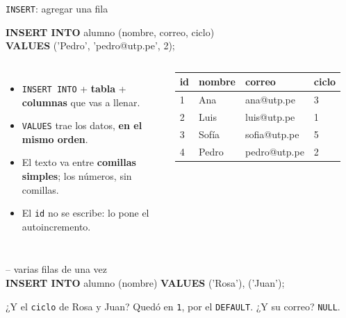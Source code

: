 \documentclass[aspectratio=169,10pt,c]{beamer}
\newcommand{\kw}[1]{\textcolor{utpRojo}{\textbf{#1}}}
\newcommand{\nuevo}[1]{{%
  \setlength{\fboxsep}{1.2pt}%
  \begingroup
  \renewcommand{\kw}[1]{\textcolor{utpNegro}{\textbf{##1}}}%
  \colorbox{yellow!45}{\textcolor{utpNegro}{#1}}%
  \endgroup}}
\newcommand{\com}[1]{\textcolor{utpGris}{-- #1}}
\newenvironment{sqlcode}[1][.86\textwidth]
  {\begin{center}\begin{lrbox}{\sqlbuf}\begin{minipage}{#1}\ttfamily\footnotesize\vspace{6pt}\raggedright}
  {\vspace{6pt}\end{minipage}\end{lrbox}\colorbox{utpGrisClaro}{\usebox{\sqlbuf}}\end{center}}
\begin{document}
\begin{frame}{\texttt{INSERT}: agregar una fila}
\begin{sqlcode}[.78\textwidth]
\kw{INSERT INTO} alumno (nombre, correo, ciclo)\\
\kw{VALUES} ('Pedro', 'pedro@utp.pe', 2);
\end{sqlcode}
\vspace{0.1cm}
\begin{columns}[c,onlytextwidth]
\small
\begin{itemize}\setlength\itemsep{4pt}
  \item \texttt{INSERT INTO} + \textbf{tabla} + \textbf{columnas} que vas a llenar.
  \item \texttt{VALUES} trae los datos, \textbf{en el mismo orden}.
  \item El texto va entre \textbf{comillas simples}; los números, sin comillas.
  \item El \texttt{id} no se escribe: lo pone el autoincremento.
\end{itemize}
\centering\scriptsize\ttfamily
\begin{tabular}{llll}
\toprule
\normalfont\bfseries id & \normalfont\bfseries nombre & \normalfont\bfseries correo & \normalfont\bfseries ciclo \\
\midrule
1 & Ana & ana@utp.pe & 3 \\
2 & Luis & luis@utp.pe & 1 \\
3 & Sofía & sofia@utp.pe & 5 \\
\nuevo{4} & \nuevo{Pedro} & \nuevo{pedro@utp.pe} & \nuevo{2} \\
\bottomrule
\end{tabular}
\end{columns}
\vspace{0.3cm}
\begin{sqlcode}[.78\textwidth]
\com{varias filas de una vez}\\
\kw{INSERT INTO} alumno (nombre) \kw{VALUES} ('Rosa'), ('Juan');
\end{sqlcode}
\vspace{-0.1cm}
\small ¿Y el \texttt{ciclo} de Rosa y Juan? Quedó en \texttt{1}, por el \texttt{DEFAULT}. ¿Y su correo? \texttt{NULL}.
\end{frame}
\end{document}
